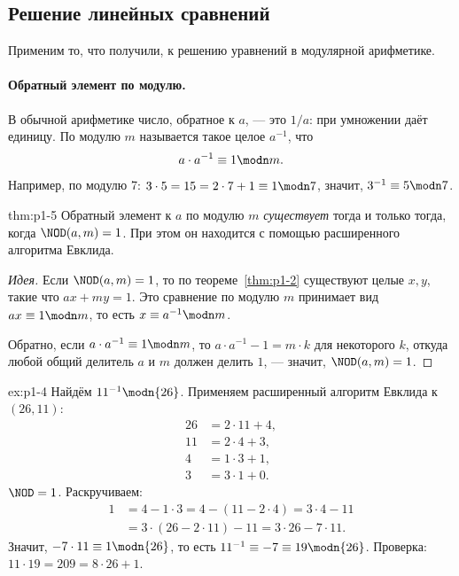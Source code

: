 \subsection{Решение линейных сравнений}

Применим то, что получили, к решению уравнений в модулярной арифметике.

\paragraph*{Обратный элемент по модулю.} В обычной арифметике число, обратное к $a$, --- это $1/a$: при умножении даёт единицу. По модулю $m$  называется такое целое $a^{-1}$, что
\[
a \cdot a^{-1} \equiv 1 \modn m.
\]
Например, по модулю 7: $3\cdot 5 = 15 = 2\cdot 7 + 1 \equiv 1 \modn 7$, значит, $3^{-1} \equiv 5 \modn 7$.

\begin{theorem}{}{thm:p1-5}
Обратный элемент к $a$ по модулю $m$ \emph{существует} тогда и только тогда, когда $\NOD(a, m) = 1$. При этом он находится с помощью расширенного алгоритма Евклида.
\end{theorem}

\begin{proof}[Идея]
Если $\NOD(a,m) = 1$, то по теореме~\ref{thm:p1-2} существуют целые $x, y$, такие что $ax + my = 1$. Это сравнение по модулю $m$ принимает вид $ax \equiv 1 \modn m$, то есть $x \equiv a^{-1} \modn m$.

Обратно, если $a\cdot a^{-1} \equiv 1 \modn m$, то $a \cdot a^{-1} - 1 = m\cdot k$ для некоторого $k$, откуда любой общий делитель $a$ и $m$ должен делить $1$, --- значит, $\NOD(a,m) = 1$.
\end{proof}

\begin{example}{}{ex:p1-4}
Найдём $11^{-1} \modn{26}$. Применяем расширенный алгоритм Евклида к $(26,11)$:
\begin{align*}
26 &= 2\cdot 11 + 4,\\
11 &= 2\cdot 4 + 3,\\
4 &= 1\cdot 3 + 1,\\
3 &= 3\cdot 1 + 0.
\end{align*}
$\NOD = 1$. Раскручиваем:
\begin{align*}
1 &= 4 - 1\cdot 3 = 4 - (11 - 2\cdot 4) = 3\cdot 4 - 11\\
&= 3\cdot (26 - 2\cdot 11) - 11 = 3\cdot 26 - 7\cdot 11.
\end{align*}
Значит, $-7\cdot 11 \equiv 1 \modn{26}$, то есть $11^{-1} \equiv -7 \equiv 19 \modn{26}$. Проверка: $11\cdot 19 = 209 = 8\cdot 26 + 1$.
\end{example}

